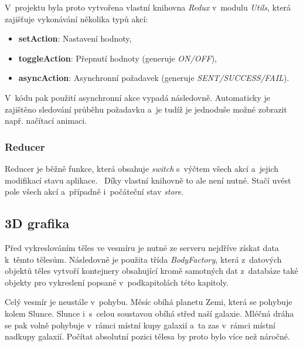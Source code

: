 \documentclass[a4paper,12pt]{article}
\begin{document}
V~projektu byla proto vytvořena vlastní knihovna \textit{Redux} v~modulu \textit{Utils}, která zajišťuje vykonávání několika typů akcí:

\begin{itemize}
\item \textbf{setAction}: Nastavení hodnoty,
\item \textbf{toggleAction}: Přepnutí hodnoty (generuje \textit{ON/OFF}),
\item \textbf{asyncAction}: Asynchronní požadavek (generuje \textit{SENT/SUCCESS/FAIL}).
\end{itemize}

V~kódu pak použití asynchronní akce vypadá následovně. Automaticky je zajištěno sledování průběhu požadavku a~je tudíž je jednoduše možné zobrazit např. načítací animaci.



\subsubsection{Reducer}

Reducer je běžně funkce, která obsahuje \textit{switch} s~výčtem všech akcí a~jejich modifikací stavu aplikace.~\cite{reactbook} Díky vlastní knihovně to ale není nutné. Stačí uvést pole všech akcí a~případně i~počáteční stav \textit{store}.



\subsection{3D grafika}

Před vykreslováním těles ve vesmíru je nutné ze serveru nejdříve získat data k~těmto tělesům. Následovně je použita třída \textit{BodyFactory}, která z~datových objektů těles vytvoří kontejnery obsahující kromě samotných dat z~databáze také objekty pro vykreslení popsané v~podkapitolách této kapitoly.

Celý vesmír je neustále v~pohybu. Měsíc obíhá planetu Zemi, která se pohybuje kolem Slunce. Slunce i~s~celou soustavou obíhá střed naší galaxie. Mléčná dráha se pak volně pohybuje v~rámci místní kupy galaxií a~ta zas v~rámci místní nadkupy galaxií. \cite{kleczek}  Počítat absolutní pozici tělesa by proto bylo více než náročné.
\end{document}
